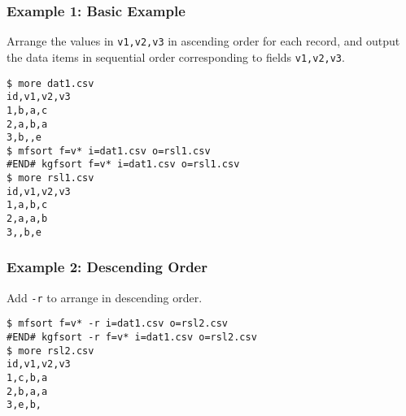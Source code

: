 \subsubsection*{Example 1: Basic Example}

Arrange the values in \verb|v1,v2,v3| in ascending order for each record, and output the data items in sequential order corresponding to fields \verb|v1,v2,v3|.


\begin{Verbatim}[baselinestretch=0.7,frame=single]
$ more dat1.csv
id,v1,v2,v3
1,b,a,c
2,a,b,a
3,b,,e
$ mfsort f=v* i=dat1.csv o=rsl1.csv
#END# kgfsort f=v* i=dat1.csv o=rsl1.csv
$ more rsl1.csv
id,v1,v2,v3
1,a,b,c
2,a,a,b
3,,b,e
\end{Verbatim}
\subsubsection*{Example 2: Descending Order}

Add \verb|-r| to arrange in descending order.


\begin{Verbatim}[baselinestretch=0.7,frame=single]
$ mfsort f=v* -r i=dat1.csv o=rsl2.csv
#END# kgfsort -r f=v* i=dat1.csv o=rsl2.csv
$ more rsl2.csv
id,v1,v2,v3
1,c,b,a
2,b,a,a
3,e,b,
\end{Verbatim}
